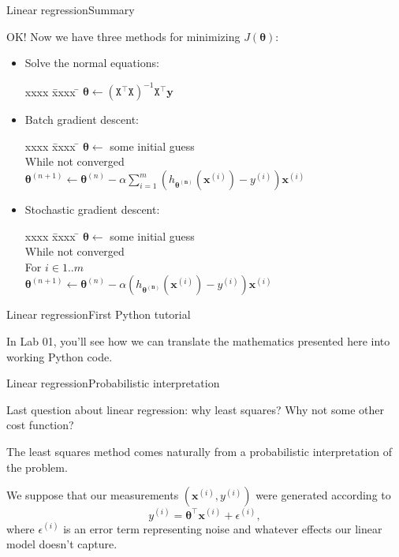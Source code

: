 \documentclass{beamer}
\renewcommand{\vec}[1]{\boldsymbol{#1}}
\newcommand{\mat}[1]{\mathtt{#1}}
\begin{document}
\begin{frame}{Linear regression}{Summary}

  OK! Now we have three methods for minimizing $J(\vec{\theta})$:
  \begin{itemize}
  \item Solve the \alert{normal equations}:
    \begin{tabbing}
      xxxx \= xxxx \= \kill
      $\vec{\theta} \leftarrow (\mat{X}^\top \mat{X})^{-1}\mat{X}^\top \vec{y}$
    \end{tabbing}
  \item \alert{Batch} gradient descent:
    \begin{tabbing}
      xxxx \= xxxx \= \kill
      $\vec{\theta} \leftarrow$ some initial guess \\
      While not converged \\
      \> $\vec{\theta}^{(n+1)} \leftarrow \vec{\theta}^{(n)} - \alpha \sum_{i=1}^m (h_{\vec{\theta^{(n)}}}(\vec{x}^{(i)}) - y^{(i)})\vec{x}^{(i)}$ 
    \end{tabbing}
  \item \alert{Stochastic} gradient descent:
    \begin{tabbing}
      xxxx \= xxxx \= \kill
      $\vec{\theta} \leftarrow$ some initial guess \\
      While not converged \\
      \> For $i \in 1..m$ \\
      \> \> $\vec{\theta}^{(n+1)} \leftarrow \vec{\theta}^{(n)} - \alpha (h_{\vec{\theta^{(n)}}}(\vec{x}^{(i)}) - y^{(i)})\vec{x}^{(i)}$
    \end{tabbing}    
  \end{itemize}

\end{frame}


\begin{frame}{Linear regression}{First Python tutorial}

  In Lab 01, you'll see how we can translate the mathematics
  presented here into working Python code.

\end{frame}


\begin{frame}{Linear regression}{Probabilistic interpretation}

  Last question about linear regression: \alert{why least squares}?
  Why not some other cost function?

  \medskip

  The least squares method comes naturally from a probabilistic
  interpretation of the problem.

  \medskip

  We suppose that our measurements $(\vec{x}^{(i)},y^{(i)})$ were
  \alert{generated} according to
  \[ y^{(i)} = \vec{\theta}^\top \vec{x}^{(i)} + \epsilon^{(i)}, \]
  where $\epsilon^{(i)}$ is an \alert{error} term representing noise
  and whatever effects our linear model doesn't capture.

\end{frame}
\end{document}
